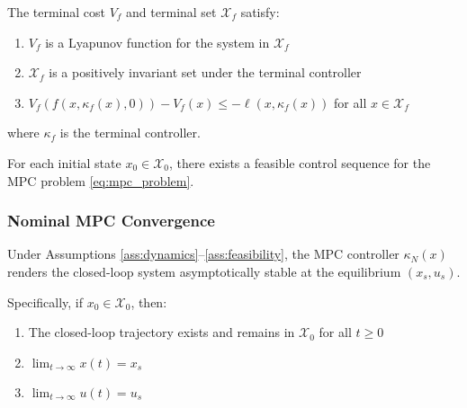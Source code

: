 \begin{assumption}
\label{ass:terminal}
The terminal cost $V_f$ and terminal set $\mathcal{X}_f$ satisfy:
\begin{enumerate}
    \item $V_f$ is a Lyapunov function for the system in $\mathcal{X}_f$
    \item $\mathcal{X}_f$ is a positively invariant set under the terminal controller
    \item $V_f(f(x, \kappa_f(x), 0)) - V_f(x) \leq -\ell(x, \kappa_f(x))$ for all $x \in \mathcal{X}_f$
\end{enumerate}
where $\kappa_f$ is the terminal controller.
\end{assumption}

\begin{assumption}[Feasibility]
\label{ass:feasibility}
For each initial state $x_0 \in \mathcal{X}_0$, there exists a feasible control sequence for the MPC problem \eqref{eq:mpc_problem}.
\end{assumption}

\subsubsection{Nominal MPC Convergence}

\begin{theorem}
\label{thm:mpc_stability}
Under Assumptions \ref{ass:dynamics}--\ref{ass:feasibility}, the MPC controller $\kappa_N(x)$ renders the closed-loop system asymptotically stable at the equilibrium $(x_s, u_s)$.

Specifically, if $x_0 \in \mathcal{X}_0$, then:
\begin{enumerate}
    \item The closed-loop trajectory exists and remains in $\mathcal{X}_0$ for all $t \geq 0$
    \item $\lim_{t \to \infty} x(t) = x_s$
    \item $\lim_{t \to \infty} u(t) = u_s$
\end{enumerate}
\end{theorem}

